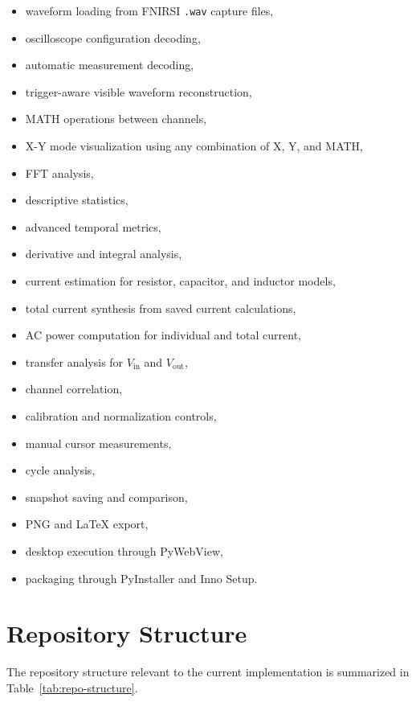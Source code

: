 \documentclass[conference]{IEEEtran}
\begin{document}
\begin{itemize}
    \item waveform loading from FNIRSI \texttt{.wav} capture files,
    \item oscilloscope configuration decoding,
    \item automatic measurement decoding,
    \item trigger-aware visible waveform reconstruction,
    \item MATH operations between channels,
    \item X-Y mode visualization using any combination of X, Y, and MATH,
    \item FFT analysis,
    \item descriptive statistics,
    \item advanced temporal metrics,
    \item derivative and integral analysis,
    \item current estimation for resistor, capacitor, and inductor models,
    \item total current synthesis from saved current calculations,
    \item AC power computation for individual and total current,
    \item transfer analysis for $V_{\text{in}}$ and $V_{\text{out}}$,
    \item channel correlation,
    \item calibration and normalization controls,
    \item manual cursor measurements,
    \item cycle analysis,
    \item snapshot saving and comparison,
    \item PNG and LaTeX export,
    \item desktop execution through PyWebView,
    \item packaging through PyInstaller and Inno Setup.
\end{itemize}

\section{Repository Structure}
The repository structure relevant to the current implementation is summarized in Table~\ref{tab:repo-structure}.
\end{document}
